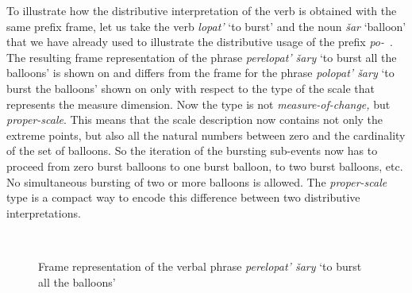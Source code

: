 To illustrate how the distributive  interpretation of the verb is obtained with the same prefix frame, let us take the verb \textit{lopat'} `to burst' and the noun \textit{\v{s}ar} `balloon' that we have already used to illustrate the distributive  usage of the prefix \mbox{\textit{po-}  .} The resulting frame representation of the phrase \textit{perelopat' \v{s}ary} `to burst all the balloons' is shown on  and differs from the frame for the phrase \textit{polopat' \v{s}ary} `to burst the balloons' shown on  only with respect to the type of the scale that represents the measure dimension. Now the type is not \textit{measure-of-change,} but \textit{proper-scale}. This means that the scale description now contains not only the extreme points, but also all the natural numbers between zero and the cardinality of the set of balloons. So the iteration of the bursting sub-events now has to proceed from zero burst balloons to one burst balloon, to two burst balloons, etc. No simultaneous bursting of two or more balloons is allowed. The \textit{proper-scale} type is a compact way to encode this difference between two distributive  interpretations.

\begin{figure}
\centering
{}\\
\hfill
\caption{Frame representation of the verbal phrase \textit{perelopat' \v{s}ary} `to burst all the balloons' \label{frame:pereburst:balloon}}
\end{figure}

